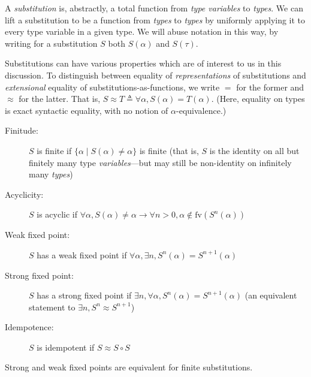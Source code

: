 \documentclass[10pt, letterpaper, oneside]{article}
\newcommand{\fv}{\mathrm{fv}}
\begin{document}
A \emph{substitution} is, abstractly, a total function from \emph{type variables} to \emph{types}. We can lift a substitution to be a function from \emph{types} to \emph{types} by uniformly applying it to every type variable in a given type. We will abuse notation in this way, by writing for a substitution \(S\) both \(S(\alpha)\) and \(S(\tau)\).

Substitutions can have various properties which are of interest to us in this discussion. To distinguish between equality of \emph{representations} of substitutions and \emph{extensional} equality of substitutions-as-functions, we write \(=\) for the former and \(\approx\) for the latter. That is, \(S \approx T \triangleq \forall \alpha, S(\alpha) = T(\alpha)\). (Here, equality on types is exact syntactic equality, with no notion of \(\alpha\)-equivalence.)

\begin{description}
\item[Finitude:] \(S\) is finite if \(\{\alpha \mid S(\alpha) \ne \alpha\}\) is finite (that is, \(S\) is the identity on all but finitely many type \emph{variables}---but may still be non-identity on infinitely many \emph{types})
\item[Acyclicity:] \(S\) is acyclic if \(\forall \alpha, S(\alpha) \ne \alpha \to \forall n > 0, \alpha \notin \fv(S^n(\alpha))\)
\item[Weak fixed point:] \(S\) has a weak fixed point if \(\forall \alpha, \exists n, S^n(\alpha) = S^{n + 1}(\alpha)\)
\item[Strong fixed point:] \(S\) has a strong fixed point if \(\exists n, \forall \alpha, S^n(\alpha) = S^{n + 1}(\alpha)\) (an equivalent statement to \(\exists n, S^n \approx S^{n + 1}\))
\item[Idempotence:] \(S\) is idempotent if \(S \approx S \circ S\)
\end{description}

\begin{lemma}
  \label{lemma:strong-weak}
  Strong and weak fixed points are equivalent for finite substitutions.
\end{lemma}
\end{document}
